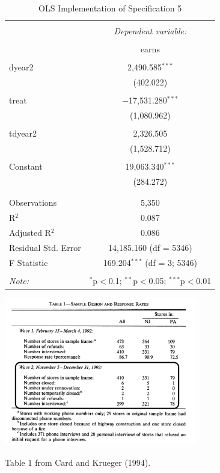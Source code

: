 \documentclass[
]{article}
\begin{document}
\newpage

\begin{table}[!htbp] \centering 
  \caption{OLS Implementation of Specification 5} 
  \label{item:lms5} 
\begin{tabular}{@{\extracolsep{5pt}}lc} 
\\[-1.8ex]\hline 
\hline \\[-1.8ex] 
 & \multicolumn{1}{c}{\textit{Dependent variable:}} \\ 
\cline{2-2} 
\\[-1.8ex] & earns \\ 
\hline \\[-1.8ex] 
 dyear2 & 2,490.585$^{***}$ \\ 
  & (402.022) \\ 
  & \\ 
 treat & $-$17,531.280$^{***}$ \\ 
  & (1,080.962) \\ 
  & \\ 
 tdyear2 & 2,326.505 \\ 
  & (1,528.712) \\ 
  & \\ 
 Constant & 19,063.340$^{***}$ \\ 
  & (284.272) \\ 
  & \\ 
\hline \\[-1.8ex] 
Observations & 5,350 \\ 
R$^{2}$ & 0.087 \\ 
Adjusted R$^{2}$ & 0.086 \\ 
Residual Std. Error & 14,185.160 (df = 5346) \\ 
F Statistic & 169.204$^{***}$ (df = 3; 5346) \\ 
\hline 
\hline \\[-1.8ex] 
\textit{Note:}  & \multicolumn{1}{r}{$^{*}$p$<$0.1; $^{**}$p$<$0.05; $^{***}$p$<$0.01} \\ 
\end{tabular} 
\end{table}

\newpage

\setcounter{table}{0} \renewcommand{\thetable}{\arabic{table}}

\begin{table}[!htb]
\centering
  \includegraphics[width=0.63\textwidth]{figures/CardKrueger_Table1.png}
  \caption{Table 1 from Card and Krueger (1994).}
  \label{fig:CK_Tab1}
\end{table}
\end{document}
